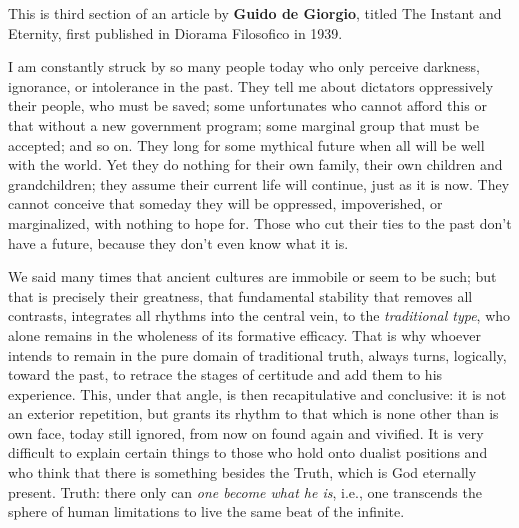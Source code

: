 \begin{quotex}
This is third section of an article by \textbf{Guido de Giorgio}, titled The Instant and Eternity, first published in Diorama Filosofico in 1939.

I am constantly struck by so many people today who only perceive darkness, ignorance, or intolerance in the past. They tell me about dictators oppressively their people, who must be saved; some unfortunates who cannot afford this or that without a new government program; some marginal group that must be accepted; and so on. They long for some mythical future when all will be well with the world. Yet they do nothing for their own family, their own children and grandchildren; they assume their current life will continue, just as it is now. They cannot conceive that someday they will be oppressed, impoverished, or marginalized, with nothing to hope for. Those who cut their ties to the past don't have a future, because they don't even know what it is.
\end{quotex}


We said many times that ancient cultures are immobile or seem to be such; but that is precisely their greatness, that fundamental stability that removes all contrasts, integrates all rhythms into the central vein, to the \emph{traditional type}, who alone remains in the wholeness of its formative efficacy. That is why whoever intends to remain in the pure domain of traditional truth, always turns, logically, toward the past, to retrace the stages of certitude and add them to his experience. This, under that angle, is then recapitulative and conclusive: it is not an exterior repetition, but grants its rhythm to that which is none other than is own face, today still ignored, from now on found again and vivified. It is very difficult to explain certain things to those who hold onto dualist positions and who think that there is something besides the Truth, which is God eternally present. Truth: there only can \emph{one become what he is}, i.e., one transcends the sphere of human limitations to live the same beat of the infinite.

